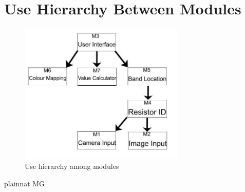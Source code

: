 \documentclass[12pt, titlepage]{article}
\begin{document}
\section{Use Hierarchy Between Modules} \label{SecUse}

\begin{figure}[H]
\centering
\includegraphics[width=0.7\textwidth]{useshierarchy}
\caption{Use hierarchy among modules}
\label{FigUH}
\end{figure}


 {plainnat}
 {MG}
\end{document}
